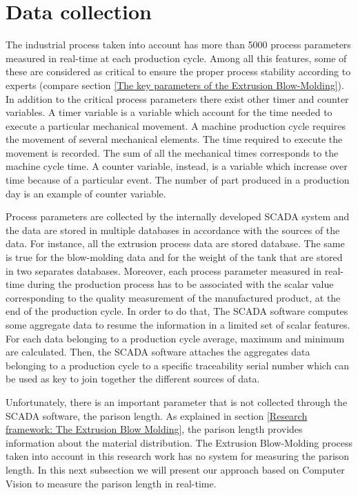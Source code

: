 

\section{Data collection}

The industrial process taken into account has more than 5000 process parameters measured in real-time at each production cycle. Among all this features, some of these are considered as critical to ensure the proper process stability according to experts (compare section \ref{The key parameters of the Extrusion Blow-Molding}). In addition to the critical process parameters there exist other timer and counter variables. A timer variable is a variable which account for the time needed to execute a particular mechanical movement. A machine production cycle requires the movement of several mechanical elements. The time required to execute the movement is recorded. The sum of all the mechanical times corresponds to the machine cycle time. A counter variable, instead, is a variable which increase over time because of a particular event. The number of part produced in a production day is an example of counter variable.  

Process parameters are collected by the internally developed SCADA system and the data are stored in multiple databases in accordance with the sources of the data. For instance, all the extrusion process data are stored database. The same is true for the blow-molding data and for the weight of the tank that are stored in two separates databases. Moreover, each process parameter measured in real-time during the production process has to be associated with the scalar value corresponding to the quality measurement of the manufactured product, at the end of the production cycle. In order to do that, The SCADA software computes some aggregate data to resume the information in a limited set of scalar features. For each data belonging to a production cycle average, maximum and minimum are calculated. Then, the SCADA software attaches the aggregates data belonging to a production cycle to a specific traceability serial number which can be used as key to join together the different sources of data. 

Unfortunately, there is an important parameter that is not collected through the SCADA software, the parison length. As explained in section \ref{Research framework: The Extrusion Blow Molding}, the parison length provides information about the material distribution. The Extrusion Blow-Molding process taken into account in this research work has no system for measuring the parison length. In this next subsection we will present our approach based on Computer Vision to measure the parison length in real-time.

